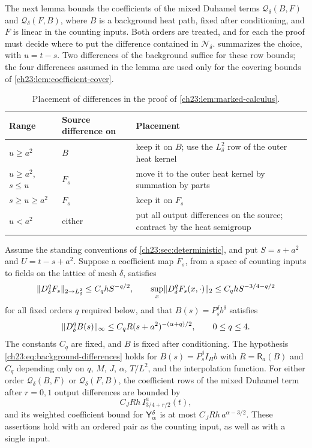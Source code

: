 The next lemma bounds the coefficients of the mixed Duhamel terms $\mathcal Q_\delta(B,F)$ and $\mathcal Q_\delta(F,B)$, where $B$ is a background heat path, fixed after conditioning, and $F$ is linear in the counting inputs. Both orders are treated, and for each the proof must decide where to put the difference contained in $\mathcal N_\delta$.  summarizes the choice, with $u=t-s$. Two differences of the background suffice for these row bounds; the four differences assumed in the lemma are used only for the covering bounds of \cref{ch23:lem:coefficient-cover}.

\begin{table}[ht]
\centering
\small
\begin{tabular}{@{}llp{}@{}}
\toprule
Range & Source difference on & Placement\\
\midrule
$u\ge a^2$ & $B$ & keep it on $B$; use the $L^2_\delta$ row of the outer heat kernel\\
$u\ge a^2$, $s\le u$ & $F_s$ & move it to the outer heat kernel by summation by parts\\
$s\ge u\ge a^2$ & $F_s$ & keep it on $F_s$\\
$u<a^2$ & either & put all output differences on the source; contract by the heat semigroup\\
\bottomrule
\end{tabular}
\caption{Placement of differences in the proof of \cref{ch23:lem:marked-calculus}.}
\label{ch23:tab:placement}
\end{table}

\begin{lemma}\label{ch23:lem:marked-calculus}
Assume the standing conventions of \cref{ch23:sec:deterministic}, and put $S=s+a^2$ and $U=t-s+a^2$. Suppose a coefficient map $F_s$, from a space of counting inputs to fields on the lattice of mesh $\delta$, satisfies
\[
 \lVert D_\delta^qF_s\rVert_{2\to L_\delta^2}\le C_qhS^{-q/2},\qquad
 \sup_x\lVert D_\delta^qF_s(x,\cdot)\rVert_2\le C_qhS^{-3/4-q/2}
\]
for all fixed orders $q$ required below, and that $B(s)=P_s^\delta b^\delta$ satisfies
\begin{equation}\label{ch23:eq:background-differences}
 \lVert D_\delta^qB(s)\rVert_\infty\le C_qR(s+a^2)^{-(\alpha+q)/2},\qquad 0\le q\le4.
\end{equation}
The constants $C_q$ are fixed, and $B$ is fixed after conditioning. The hypothesis \eqref{ch23:eq:background-differences} holds for $B(s)=P_s^\delta I_Hb$ with $R=\mathsf R_a(B)$ and $C_q$ depending only on $q$, $M$, $J$, $\alpha$, $T/L^2$, and the interpolation function. For either order $\mathcal Q_\delta(B,F)$ or $\mathcal Q_\delta(F,B)$, the coefficient rows of the mixed Duhamel term after $r=0,1$ output differences are bounded by
\[
 C_JRh\,I_{3/4+r/2}^a(t),
\]
and its weighted coefficient bound for $\mathsf Y_{\alpha}^{\delta}$ is at most $C_JRh\,a^{\alpha-3/2}$. These assertions hold with an ordered pair as the counting input, as well as with a single input.
\end{lemma}

